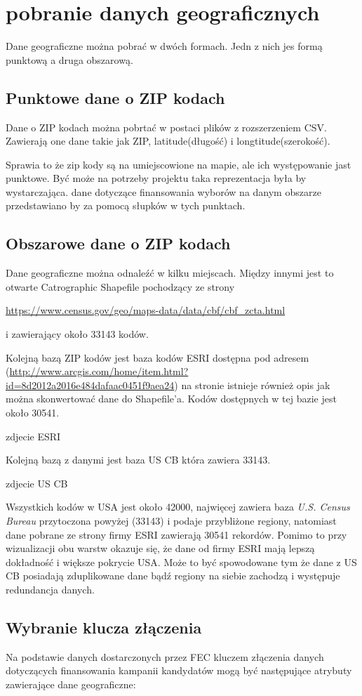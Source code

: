 \documentclass[10pt,a4paper]{article}
\begin{document}
\section{pobranie danych geograficznych}
Dane geograficzne można pobrać w dwóch formach. Jedn z nich jes formą punktową a druga obszarową.
\subsection{Punktowe dane o ZIP kodach}
Dane o ZIP kodach można pobrtać w postaci plików z rozszerzeniem CSV. Zawierają one dane takie jak ZIP, latitude(długość) i longtitude(szerokość).

Sprawia to że zip kody są na umiejscowione na mapie, ale ich występowanie jast punktowe.
Być może na potrzeby projektu taka reprezentacja była by wystarczająca. dane dotyczące finansowania wyborów na danym obszarze przedstawiano by za pomocą słupków w tych punktach.

\subsection{Obszarowe dane o ZIP kodach}
Dane geograficzne można odnaleźć w kilku miejscach.
Między innymi jest to otwarte Catrographic Shapefile pochodzący ze strony 

\url {https://www.census.gov/geo/maps-data/data/cbf/cbf_zcta.html}

i zawierający około 33143 kodów.


Kolejną bazą ZIP kodów jest baza kodów ESRI dostępna pod adresem (\url{http://www.arcgis.com/home/item.html?id=8d2012a2016e484dafaac0451f9aea24}) na stronie istnieje również opis jak można skonwertować dane do Shapefile'a. Kodów dostępnych w tej bazie jest około 30541. 

zdjecie ESRI

Kolejną bazą z danymi jest baza US CB która zawiera 33143. 
 
zdjecie US CB 
 
Wszystkich kodów w  USA jest około 42000, najwięcej zawiera baza  \textit{U.S. Census Bureau} przytoczona powyżej (33143) i podaje przybliżone regiony, natomiast dane pobrane ze strony firmy ESRI zawierają 30541 rekordów. Pomimo to przy wizualizacji obu warstw okazuje się, że dane od firmy ESRI mają lepszą dokładność i większe pokrycie USA. Może to być spowodowane tym że dane z US CB posiadają zduplikowane dane bądź regiony na siebie zachodzą i występuje redundancja danych.


\subsection{Wybranie klucza złączenia}
Na podstawie danych dostarczonych przez FEC kluczem złączenia danych dotyczących finansowania kampanii kandydatów mogą być następujące atrybuty zawierające dane geograficzne:
\end{document}
